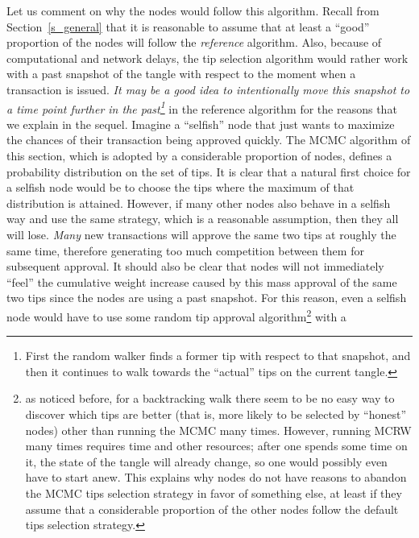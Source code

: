 \documentclass[12pt]{article}
\begin{document}
\begin{CJK}{UTF8}{bkai}
Let us comment on why 
 the nodes would follow this algorithm.
Recall from Section~\ref{s_general} that
it is reasonable to assume that at least a ``good'' proportion
of the nodes will follow the \emph{reference} algorithm.
Also, because of computational and network delays, the 
tip selection algorithm would rather work with a past snapshot
of the tangle with respect to the moment when a transaction
is issued. \emph{It may be a good idea to intentionally
move this snapshot to a time point further in the past\footnote{First
the random walker finds a former tip with respect to that snapshot,
and then it continues to walk towards the ``actual'' tips
on the current tangle.}} in the reference algorithm 
for the reasons that we explain in the sequel.
Imagine a ``selfish'' node that just wants to maximize 
the chances of their transaction being approved quickly.
The MCMC algorithm of this section, which is adopted by a
 considerable proportion of nodes, 
defines a probability
distribution on the set of tips. 
It is clear that a natural first choice for a selfish node would be
to choose the tips where the maximum of that distribution 
is attained. However, if many other nodes also behave
in a selfish way 
 and use the same strategy, which is a reasonable assumption, 
 then they all 
will lose. \emph{Many} new transactions will approve 
the same two tips at roughly the same time, therefore
generating too much competition between them for subsequent approval.
It should also be clear that nodes will not immediately ``feel'' the cumulative 
weight increase caused by this mass approval of the same two tips since 
the nodes are using a past snapshot.
 For this reason, even a selfish node would have 
to use some random tip approval algorithm\footnote{as noticed
before, for a backtracking walk there 
seem to be no easy way to discover which tips are 
 better (that is, more likely to be selected
by ``honest'' nodes) other than running the MCMC many times.
However, running MCRW many times requires time and other
resources; after one spends some time on it, 
the state of the tangle will already change, 
so one would possibly even have to start anew.
This explains why nodes do not have reasons
to abandon the MCMC tips selection strategy in favor
of something else, at least if they assume that a 
considerable proportion of the other nodes follow
the default tips selection strategy.}
 with a 

\end{CJK}
\end{document}
